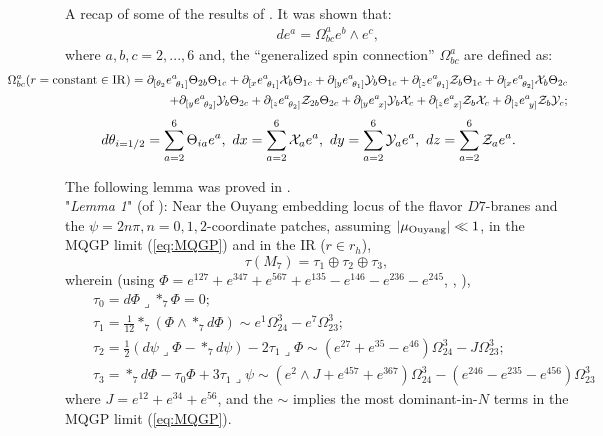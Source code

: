 \documentclass[a4paper,11pt,fleqn]{article}
\theoremstyle{plain}
\theoremstyle{definition}
\begin{document}
A recap of some of the results of \cite{ACMS}. It was shown that:
\begin{eqnarray}
\label{Omega^a_bc-i}
& & de^a = \Omega^a_{bc}e^b\wedge e^c,
\end{eqnarray}
where $a, b, c = 2,...,6$ and, the ``generalized spin connection'' $\Omega^a_{bc}$ are defined as:
{\footnotesize
\begin{eqnarray}
\label{Omega^a_bc-ii}
& & \hskip -0.8in \Omega^a_{bc}(r={\rm constant}\in{\rm IR}) = \partial_{[\theta_2}e^a_{\ \theta_1]}\Theta_{2b}\Theta_{1c}
+ \partial_{[x}e^a_{\ \theta_1]}{\cal X}_b\Theta_{1c} + 
\partial_{[y}e^a_{\ \theta_1]}{\cal Y}_b\Theta_{1c} + \partial_{[z}e^a_{\ \theta_1]}{\cal Z}_{b}\Theta_{1c}
+ \partial_{[x}e^a_{\ \theta_2]}{\cal X}_b\Theta_{2c}\nonumber\\
& &  \hskip -0.8in  + \partial_{[y}e^a_{\ \theta_2]}{\cal Y}_b\Theta_{2c} + \partial_{[z}e^a_{\ \theta_2]}{\cal Z}_{2b}\Theta_{2c}
+ \partial_{[y}e^a_{\ x]}{\cal Y}_b{\cal X}_{c} +\partial_{[z}e^a_{\ x]}{\cal Z}_b{\cal X}_{c} +\partial_{[z}e^a_{\ y]}{\cal Z}_b{\cal Y}_{c};
\end{eqnarray}
}
\begin{eqnarray}
\label{Theta_ia+X_a+Y_a+Z_a}
& & \hskip -0.3 in d\theta_{i=1/2} = \sum_{a=2}^6\Theta_{ia}e^a,\  dx = \sum_{a=2}^6{\cal X}_ae^a,\  dy = \sum_{a=2}^6{\cal Y}_ae^a,\
dz = \sum_{a=2}^6{\cal Z}_ae^a.
\end{eqnarray}

The following lemma was proved in \cite{ACMS}.\\
\noindent "{\it Lemma 1}" (of \cite{ACMS}): Near the Ouyang embedding locus of the flavor $D7$-branes and the $\psi=2n\pi, n=0, 1, 2$-coordinate patches, assuming $|\mu_{\rm Ouyang}|\ll1$, in the MQGP limit (\ref{eq:MQGP}) and in the IR ($r\in r_h$), 
\begin{equation}
\label{G2-torsion}
\tau\left(M_7\right) = \tau_1\oplus\tau_2\oplus\tau_3,
\end{equation}
wherein (using $\Phi = e^{127} + e^{347} + e^{567} + e^{135} - e^{146} - e^{236} - e^{245}$, \cite{Karigiannis}, \cite{J. G. J. Held's thesis [2012]}),
\begin{eqnarray}
\label{taus}
& & \tau_0 = d\Phi\lrcorner*_7\Phi =0;\nonumber\\
& & \tau_1 = \frac{1}{12}*_7\left(\Phi \wedge *_7 d\Phi\right) \sim e^1\Omega^3_{24}-e^7\Omega^3_{23};\nonumber\\
& & \tau_2 = \frac{1}{2}\left(d\psi\lrcorner\Phi - *_7d\psi\right) -2\tau_1\lrcorner\Phi \sim \left(e^{27} + e^{35} - e^{46}\right)\Omega^3_{24} - J \Omega^3_{23};\nonumber\\
& & \tau_3 = *_7d\Phi - \tau_0\Phi + 3 \tau_1\lrcorner\psi \sim \left(e^2\wedge J + e^{457} + e^{367}\right)\Omega^3_{24}
- \left(e^{246} - e^{235} - e^{456}\right)\Omega^3_{23}
\end{eqnarray}
where $J = e^{12} + e^{34} + e^{56}$, and the $\sim$ implies the most dominant-in-$N$ terms in the MQGP limit (\ref{eq:MQGP}). 
\end{document}
